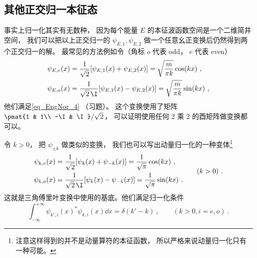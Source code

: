 \subsection{其他正交归一本征态}
事实上归一化其实有无数种， 因为每个能量 $E$ 的本征波函数空间是一个二维简并空间， 我们可以把以上正交归一的 $\psi_{E,1}, \psi_{E,2}$ 做一个任意幺正变换后仍然得到两个正交归一的解。 最常见的方法例如令（角标 $o$ 代表 odd， $e$ 代表 even）
\begin{equation}
\begin{aligned}
\psi_{E,e}(x) &= \frac{1}{\sqrt{2}}[\psi_{E,1}(x) + \psi_{E,2}(x)] = \sqrt{\frac{m}{\pi k}}\cos(kx)~,\\
\psi_{E,o}(x) &= \frac{1}{\sqrt{2}\,\I}[\psi_{E,1}(x) - \psi_{E,2}(x)] = \sqrt{\frac{m}{\pi k}}\sin(kx)~,
\end{aligned}
\end{equation}
他们满足\autoref{eq_EngNor_4} （习题）。 这个变换使用了矩阵 $\pmat{1 & 1\\ -\I & \I}/\sqrt{2}$， 可以证明使用任何 2 乘 2 的酉矩阵做变换都可以。

令 $k > 0$， 把 $\psi_{\pm k}$ 做类似的变换， 我们也可以写出动量归一化的一种变体\footnote{注意这样得到的并不是动量算符的本征函数， 所以严格来说动量归一化只有一种可能。}
\begin{equation}\label{eq_EngNor_5}
\begin{aligned}
\psi_{k,e}(x) &= \frac{1}{\sqrt{2}}[\psi_{k}(x) + \psi_{-k}(x)] = \frac{1}{\sqrt{\pi}}\cos(kx)~,\\
\psi_{k,o}(x) &= \frac{1}{\sqrt{2}\,\I}[\psi_{k}(x) - \psi_{-k}(x)] = \frac{1}{\sqrt{\pi}}\sin(kx)~.
\end{aligned}
\qquad (k > 0)~.
\end{equation}
这就是三角傅里叶变换中使用的基底。他们满足归一化条件
\begin{equation}\label{eq_EngNor_3}
\int_{-\infty}^{+\infty} \psi_{k',i}(x)^* \psi_{k,i}(x) \dd{x} = \delta(k' - k) ~,\qquad (k > 0, i = e, o)~.
\end{equation}
